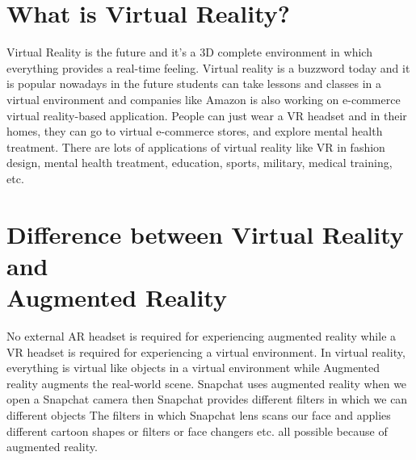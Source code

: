\section{What is Virtual Reality?} 
\justifying
Virtual Reality is the future and it's a 3D complete environment in which everything provides a real-time feeling. Virtual reality is a buzzword today and it is popular nowadays in the future students can take lessons and classes in a virtual environment and companies like Amazon is also working on e-commerce virtual reality-based application. People can just wear a VR headset and in their homes, they can go to virtual e-commerce stores, and explore mental health treatment. There are lots of applications of virtual reality like VR in fashion design, mental health treatment, education, sports, military, medical training, etc.

\section{Difference between Virtual Reality and \\ Augmented Reality}

\justifying
No external AR headset is required for experiencing augmented reality while a VR headset is required for experiencing a virtual environment. In virtual reality, everything is virtual like objects in a virtual environment while Augmented reality augments the real-world scene. Snapchat uses augmented reality when we open a Snapchat camera then Snapchat provides different filters in which we can different objects The filters in which Snapchat lens scans our face and applies different cartoon shapes or filters or face changers etc. all possible because of augmented reality.


